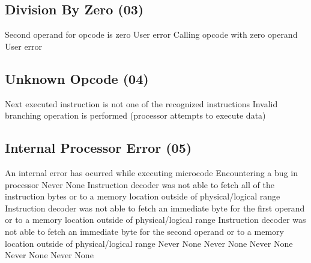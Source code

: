 \subsection{Division By Zero (03)}
           {Second operand for  opcode is zero}
           {User error}
           {}
           {Calling  opcode with zero operand}
           {User error}
           {}


\subsection{Unknown Opcode (04)}
           {Next executed instruction is not one of the recognized instructions}
           {Invalid branching operation is performed (processor attempts to execute data)}
           {}


\subsection{Internal Processor Error (05)}
           {An internal error has ocurred while executing microcode}
           {Encountering a bug in processor}
           {}
           {Never}
           {None}
           {}
           {Instruction decoder was not able to fetch all of the instruction bytes}
           { or  to a memory location outside of physical/logical range}
           {}
           {Instruction decoder was not able to fetch an immediate byte for the first operand}
           { or  to a memory location outside of physical/logical range}
           {}
           {Instruction decoder was not able to fetch an immediate byte for the second operand}
           { or  to a memory location outside of physical/logical range}
           {}
           {Never}
           {None}
           {}
           {Never}
           {None}
           {}
           {Never}
           {None}
           {}
           {Never}
           {None}
           {}
           {Never}
           {None}
           {}


